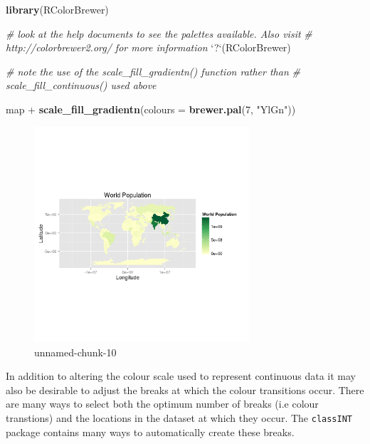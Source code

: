 \documentclass[]{article}
\newenvironment{Shaded}{}{}
\newcommand{\KeywordTok}[1]{\textcolor[rgb]{0.00,0.44,0.13}{\textbf{{#1}}}}
\newcommand{\DataTypeTok}[1]{\textcolor[rgb]{0.56,0.13,0.00}{{#1}}}
\newcommand{\DecValTok}[1]{\textcolor[rgb]{0.25,0.63,0.44}{{#1}}}
\newcommand{\StringTok}[1]{\textcolor[rgb]{0.25,0.44,0.63}{{#1}}}
\newcommand{\CommentTok}[1]{\textcolor[rgb]{0.38,0.63,0.69}{\textit{{#1}}}}
\newcommand{\NormalTok}[1]{{#1}}
\let\Oldincludegraphics\includegraphics
\renewcommand{\includegraphics}[1]{\Oldincludegraphics[width=8cm]{#1}}
\begin{document}
\begin{Shaded}
\begin{Highlighting}[]
\KeywordTok{library}\NormalTok{(RColorBrewer)}

\CommentTok{# look at the help documents to see the palettes available. Also visit}
\CommentTok{# http://colorbrewer2.org/ for more information}
\StringTok{`}\DataTypeTok{?}\StringTok{`}\NormalTok{(RColorBrewer)}

\CommentTok{# note the use of the scale_fill_gradientn() function rather than}
\CommentTok{# scale_fill_continuous() used above}

\NormalTok{map + }\KeywordTok{scale_fill_gradientn}\NormalTok{(}\DataTypeTok{colours =} \KeywordTok{brewer.pal}\NormalTok{(}\DecValTok{7}\NormalTok{, }\StringTok{"YlGn"}\NormalTok{))}
\end{Highlighting}
\end{Shaded}
\begin{figure}[htbp]
\centering
\includegraphics{figure/unnamed-chunk-10.png}
\caption{unnamed-chunk-10}
\end{figure}

In addition to altering the colour scale used to represent continuous
data it may also be desirable to adjust the breaks at which the colour
transitions occur. There are many ways to select both the optimum number
of breaks (i.e colour transtions) and the locations in the dataset at
which they occur. The \texttt{classINT} package contains many ways to
automatically create these breaks.
\end{document}
